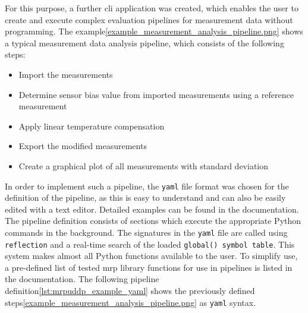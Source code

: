For this purpose, a further \gls{cli} application was created, which
enables the user to create and execute complex evaluation pipelines for
measurement data without programming. The
example\ref{example_measurement_analysis_pipeline.png} shows a typical
measurement data analysis pipeline, which consists of the following
steps:

\begin{itemize}
\tightlist
\item
  Import the measurements
\item
  Determine sensor bias value from imported measurements using a
  reference measurement
\item
  Apply linear temperature compensation
\item
  Export the modified measurements
\item
  Create a graphical plot of all measurements with standard deviation
\end{itemize}

In order to implement such a pipeline, the
\passthrough{\lstinline!yaml!} file format was chosen for the definition
of the pipeline, as this is easy to understand and can also be easily
edited with a text editor. Detailed examples can be found in the
documentation\cite{MagneticReadoutProcessingReadTheDocs}. The
pipeline definition consists of sections which execute the appropriate
Python commands in the background. The signatures in the
\passthrough{\lstinline!yaml!} file are called using
\passthrough{\lstinline!reflection!} and a real-time search of the
loaded
\passthrough{\lstinline!global() symbol table!}\cite{PythonGlobalSymbolTable}.
This system makes almost all Python functions available to the user. To
simplify use, a pre-defined list of tested \gls{mrp} library functions
for use in pipelines is listed in the
documentation\cite{MagneticReadoutProcessingReadTheDocs}. The
following pipeline definition\ref{lst:mrpuddp_example_yaml} shows the
previously defined steps\ref{example_measurement_analysis_pipeline.png}
as \passthrough{\lstinline!yaml!} syntax.

